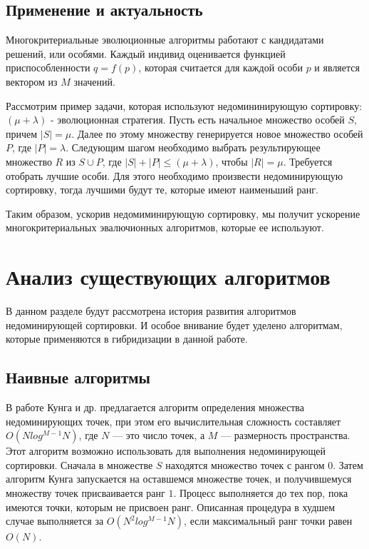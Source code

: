 \subsection{Применение и актуальность}

Многокритериальные эволюционные алгоритмы работают с кандидатами решений, или особями. Каждый индивид оценивается
функцией приспособленности $q=f(p)$, которая считается для каждой особи $p$ и является вектором из $M$ значений.

Рассмотрим пример задачи, которая используют недомининирующую сортировку: $(\mu + \lambda)$ - эволюционная стратегия.
Пусть есть начальное множество особей $S$, причем $|S| = \mu$. Далее по этому множеству генерируется новое множество
особей $P$, где  $|P| = \lambda$. Следующим шагом необходимо выбрать результирующее множество $R$ из $S \cup P$,
где $|S|+|P| \leq (\mu + \lambda)$, чтобы $|R|= \mu$. Требуется отобрать лучшие особи. Для этого необходимо
произвести недоминирующую сортировку, тогда лучшими будут те, которые имеют наименьший ранг.

Таким образом, ускорив недомиминирующую сортировку, мы получит ускорение многокритериальных эвалючионных
алгоритмов, которые ее используют.

\section{Анализ существующих алгоритмов}

В данном разделе будут рассмотрена история развития алгоритмов недоминирующей сортировки. И особое внивание будет
уделено алгоритмам, которые применяются в гибридизации в данной работе.

\subsection{Наивные алгоритмы}

В работе Кунга и др. \cite{Kung} предлагается алгоритм определения множества недоминирующих точек, при этом его
вычислительная сложность составляет $O(N log^{M-1} N)$, где $N$ — это число точек, а $M$ — размерность пространства.
Этот алгоритм возможно использовать для выполнения недоминирующей сортировки. Сначала в множестве $S$ находятся
множество точек с рангом $0$. Затем алгоритм Кунга запускается на оставшемся множестве точек, и получившемуся
множеству точек присваивается ранг $1$. Процесс выполняется до тех пор, пока имеются точки, которым не присвоен ранг.
Описанная процедура в худшем случае выполняется за $O(N^2 log^{M-1} N)$, если максимальный ранг точки равен $O(N)$.

